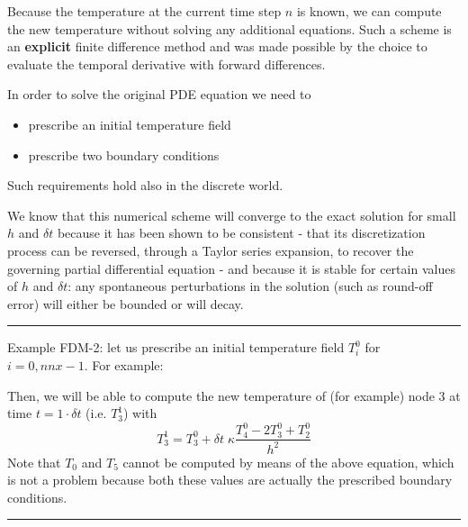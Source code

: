 Because the temperature at the current time step $n$ is known,
we can compute the new temperature without solving any additional equations.
Such a scheme is an {\bf explicit} finite difference method and
was made possible by the choice to evaluate the temporal derivative with forward differences.

\begin{center}

\end{center}

\noindent In order to solve the original PDE equation we need to
\begin{itemize}
\item prescribe an initial temperature field
\item prescribe two boundary conditions 
\end{itemize}
Such requirements hold also in the discrete world. 

We know that this numerical scheme will converge to the exact solution for
small $h$ and $\delta t$ because it has been shown to be {\color{olive}consistent} - 
that its discretization process
can be reversed, through a Taylor series expansion, to recover the governing partial differential equation -
and because it is {\color{olive}stable} for certain values of
$h$ and $\delta t$: any spontaneous perturbations in the solution (such as round-off error) 
will either be bounded or will decay.

\begin{center}
\begin{minipage}[t]{0.77\textwidth}
\par\noindent\rule{\textwidth}{0.4pt}
{\color{blue} Example FDM-2}: let us prescribe an initial temperature field $T_i^0$ for $i=0,nnx-1$.
For example:

\begin{center}

\end{center}

Then, we will be able to compute the new temperature of (for example) 
node 3 at time $t=1\cdot \delta t$ 
(i.e. $T_3^1$) with 
\begin{equation}
T_3^{1}=T_3^0 + \delta t \; \kappa \frac{T_{4}^0 - 2T_3^0 + T_{2}^0}{h^2}
\end{equation}
Note that $T_0$ and $T_5$ cannot be computed by means of the above equation, 
which is not a problem because both these values are actually the prescribed 
boundary conditions. 

\par\noindent\rule{\textwidth}{0.4pt}
\end{minipage}
\end{center}


